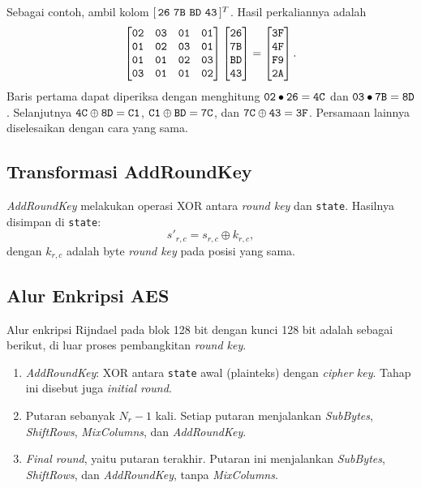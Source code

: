Sebagai contoh, ambil kolom
$[\,\code{26}\ \code{7B}\ \code{BD}\ \code{43}\,]^{T}$. Hasil perkaliannya adalah
\[
\begin{bmatrix}
\texttt{02} & \texttt{03} & \texttt{01} & \texttt{01} \\
\texttt{01} & \texttt{02} & \texttt{03} & \texttt{01} \\
\texttt{01} & \texttt{01} & \texttt{02} & \texttt{03} \\
\texttt{03} & \texttt{01} & \texttt{01} & \texttt{02}
\end{bmatrix}
\begin{bmatrix}
\texttt{26} \\ \texttt{7B} \\ \texttt{BD} \\ \texttt{43}
\end{bmatrix}
=
\begin{bmatrix}
\texttt{3F} \\ \texttt{4F} \\ \texttt{F9} \\ \texttt{2A}
\end{bmatrix}.
\]
Baris pertama dapat diperiksa dengan menghitung
$\texttt{02} \bullet \texttt{26} = \texttt{4C}$ dan
$\texttt{03} \bullet \texttt{7B} = \texttt{8D}$. Selanjutnya
$\texttt{4C} \oplus \texttt{8D} = \texttt{C1}$,
$\texttt{C1} \oplus \texttt{BD} = \texttt{7C}$, dan
$\texttt{7C} \oplus \texttt{43} = \texttt{3F}$. Persamaan lainnya diselesaikan dengan
cara yang sama.

\subsection{Transformasi AddRoundKey}

\textit{AddRoundKey} melakukan operasi XOR antara \textit{round key} dan
\texttt{state}. Hasilnya disimpan di \texttt{state}:
\begin{equation}
s'_{r,c} = s_{r,c} \oplus k_{r,c},
\label{eq:aes-addroundkey}
\end{equation}
dengan $k_{r,c}$ adalah byte \textit{round key} pada posisi yang sama.

\subsection{Alur Enkripsi AES}

Alur enkripsi Rijndael pada blok 128 bit dengan kunci 128 bit adalah sebagai
berikut, di luar proses pembangkitan \textit{round key}.
\begin{enumerate}
    \item \textit{AddRoundKey}: XOR antara \texttt{state} awal (plainteks) dengan
    \textit{cipher key}. Tahap ini disebut juga \textit{initial round}.
    \item Putaran sebanyak $N_r - 1$ kali. Setiap putaran menjalankan
    \textit{SubBytes}, \textit{ShiftRows}, \textit{MixColumns}, dan
    \textit{AddRoundKey}.
    \item \textit{Final round}, yaitu putaran terakhir. Putaran ini menjalankan
    \textit{SubBytes}, \textit{ShiftRows}, dan \textit{AddRoundKey}, tanpa
    \textit{MixColumns}.
\end{enumerate}

